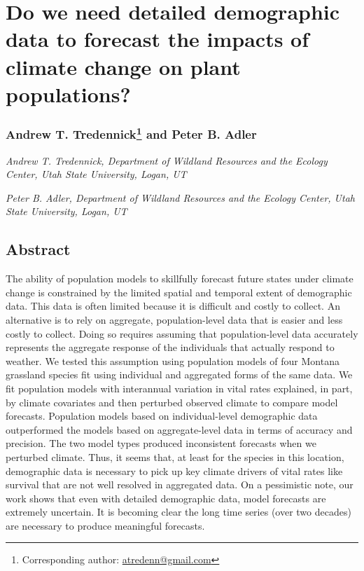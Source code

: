 \documentclass[12pt,]{article}
\author{}
\date{}
\begin{document}
\normalsize


\section{Do we need detailed demographic data to forecast the impacts of
climate change on plant
populations?}\label{do-we-need-detailed-demographic-data-to-forecast-the-impacts-of-climate-change-on-plant-populations}

\subsubsection[Andrew T. Tredennick and Peter B. Adler]{Andrew T.
Tredennick\footnote{Corresponding author:
  \href{mailto:atredenn@gmail.com}{\href{mailto:atredenn@gmail.com}{atredenn@gmail.com}}}
and Peter B.
Adler}\label{andrew-t.-tredennickcorrauth-and-peter-b.-adler}

\emph{Andrew T. Tredennick, Department of Wildland Resources and the
Ecology Center, Utah State University, Logan, UT}

\emph{Peter B. Adler, Department of Wildland Resources and the Ecology
Center, Utah State University, Logan, UT}

\subsection{Abstract}\label{abstract}

The ability of population models to skillfully forecast future states
under climate change is constrained by the limited spatial and temporal
extent of demographic data. This data is often limited because it is
difficult and costly to collect. An alternative is to rely on aggregate,
population-level data that is easier and less costly to collect. Doing
so requires assuming that population-level data accurately represents
the aggregate response of the individuals that actually respond to
weather. We tested this assumption using population models of four
Montana grassland species fit using individual and aggregated forms of
the same data. We fit population models with interannual variation in
vital rates explained, in part, by climate covariates and then perturbed
observed climate to compare model forecasts. Population models based on
individual-level demographic data outperformed the models based on
aggregate-level data in terms of accuracy and precision. The two model
types produced inconsistent forecasts when we perturbed climate. Thus,
it seems that, at least for the species in this location, demographic
data is necessary to pick up key climate drivers of vital rates like
survival that are not well resolved in aggregated data. On a pessimistic
note, our work shows that even with detailed demographic data, model
forecasts are extremely uncertain. It is becoming clear the long time
series (over two decades) are necessary to produce meaningful forecasts.
\end{document}
